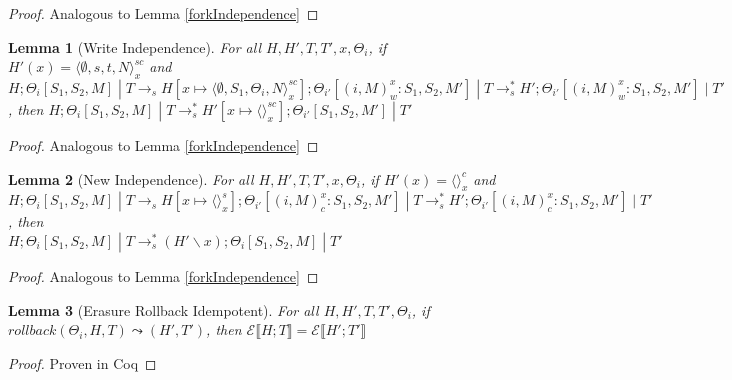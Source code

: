 \documentclass[9pt]{article}
\newtheorem{lemma}{Lemma}
\newcommand\specStep{\rightarrow_{s}}
\newcommand{\erase}[1]{\mathcal{E}\llbracket #1 \rrbracket}
\begin{document}
\begin{proof}
Analogous to Lemma \ref{forkIndependence}
\end{proof}



\begin{lemma}[Write Independence]
\label{writeIndependence}
For all $H, H', T, T', x, \Theta_i$, if $H'(x) = \langle \emptyset, s, t, N\rangle_x^{sc}$ and \\
$H;\Theta_i[S_1, S_2, M] \; | \; T \specStep H[x\mapsto \langle \emptyset, S_1, \Theta_i, N\rangle_x^{sc}]; \Theta_{i'}[(i, M)_w^x : S_1, S_2, M'] \; | \; T \specStep^* H'; \Theta_{i'}[(i, M)_w^x : S_1, S_2, M'] \; | \; T'$, then $H;\Theta_i[S_1, S_2, M] \; | \; T  \specStep^* H'[x\mapsto \langle\rangle_x^{sc}]; \Theta_{i'}[S_1, S_2, M'] \; | \; T'$
\end{lemma}

\begin{proof}
Analogous to Lemma \ref{forkIndependence}
\end{proof}

\begin{lemma}[New Independence]
\label{newIndependence}
For all $H, H', T, T', x, \Theta_i$, if $H'(x) = \langle\rangle_x^c$ and \\
$H; \Theta_i[S_1, S_2, M] \; | \; T \specStep H[x \mapsto \langle\rangle_x^s]; \Theta_{i'}[(i, M)_c^x : S_1, S_2, M'] \; | \; T \specStep^* H'; \Theta_{i'}[(i, M)_c^x : S_1, S_2, M'] \; | \; T'$, then\\
$H; \Theta_i[S_1, S_2, M] \; | \; T \specStep^* (H' \backslash x); \Theta_i[S_1, S_2, M] \; | \; T'$
\end{lemma}

\begin{proof}
Analogous to Lemma \ref{forkIndependence}
\end{proof}

\begin{lemma}[Erasure Rollback Idempotent]
\label{eraseRollbackIdempotence}
For all $H, H', T, T', \Theta_i$, if $rollback(\Theta_i, H, T) \leadsto (H', T')$, then $\erase{H; T} = \erase{H'; T'}$

\end{lemma}

\begin{proof}
Proven in Coq
\end{proof}
\end{document}
